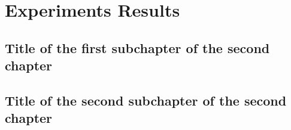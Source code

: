 \chapter{Experiments Results}

\section{Title of the first subchapter of the second chapter}

\section{Title of the second subchapter of the second chapter}
